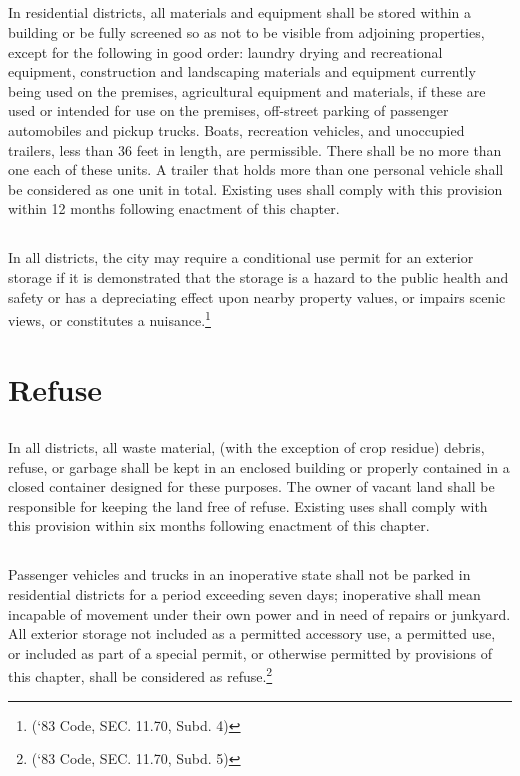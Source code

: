 \subsection{}
In residential districts, all materials and equipment shall be stored within a building or be fully screened so as not to be visible from adjoining properties, except for the following in good order: laundry drying and recreational equipment, construction and landscaping materials and equipment currently being used on the premises, agricultural equipment and materials, if these are used or intended for use on the premises, off-street parking of passenger automobiles and pickup trucks. Boats, recreation vehicles, and unoccupied trailers, less than 36 feet in length, are permissible. There shall be no more than one each of these units. A trailer that holds more than one personal vehicle shall be considered as one unit in total.  Existing uses shall comply with this provision within 12 months following enactment of this chapter.
\subsection{}
In all districts, the city may require a conditional use permit for an exterior storage if it is demonstrated that the storage is a hazard to the public health and safety or has a depreciating effect upon nearby property values, or impairs scenic views, or constitutes a nuisance.\footnote{(‘83 Code, SEC. 11.70, Subd. 4)}

\section{Refuse}
\subsection{}
In all districts, all waste material, (with the exception of crop residue) debris, refuse, or garbage shall be kept in an enclosed building or properly contained in a closed container designed for these purposes. The owner of vacant land shall be responsible for keeping the land free of refuse.  Existing uses shall comply with this provision within six months following enactment of this chapter.
\subsection{}
Passenger vehicles and trucks in an inoperative state shall not be parked in residential districts for a period exceeding seven days; inoperative shall mean incapable of movement under their own power and in need of repairs or junkyard. All exterior storage not included as a permitted accessory use, a permitted use, or included as part of a special permit, or otherwise permitted by provisions of this chapter, shall be considered as refuse.\footnote{(‘83 Code, SEC. 11.70, Subd. 5)}

